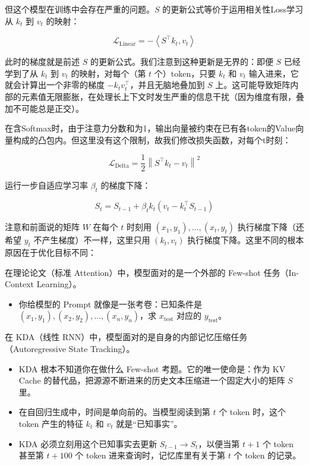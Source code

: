 但这个模型在训练中会存在严重的问题。\(S\) 的更新公式等价于运用相关性Loss学习从 \(k_t\) 到 \(v_t\) 的映射：

\[
\mathcal{L}_{\mathrm{Linear}}=-\left\langle S^\top k_t,v_t\right\rangle
\]

此时的梯度就是前述 \(S\) 的更新公式。我们注意到这种更新是无界的：即便 \(S\) 已经学到了从 \(k_t\) 到 \(v_t\) 的映射，对每个（第 \(t\) 个）token，只要 \(k_t\) 和 \(v_t\) 输入进来，它就会计算出一个非零的梯度 \(-k_tv_t^\top\)，并且无脑地叠加到 \(S\) 上。这可能导致矩阵内部的元素值无限膨胀，在处理长上下文时发生严重的信息干扰（因为维度有限，叠加不可能总是正交）。

在含Softmax时，由于注意力分数和为1，输出向量被约束在已有各token的Value向量构成的凸包内。但这里没有这个限制，故我们修改损失函数，对每个t时刻：

\[
\mathcal{L}_{\mathrm{Delta}}=\frac{1}{2}\left\lVert S^\top k_t-v_t\right\rVert^2
\]

运行一步自适应学习率 \(\beta_t\) 的梯度下降：

\[
S_t=S_{t-1}+\beta_tk_t\left(v_t-k_t^\top S_{t-1}\right)
\]

注意和前面说的矩阵 \(W\) 在每个 \(t\) 时刻用 \((x_1,y_1),\ldots,(x_t,y_t)\) 执行梯度下降（还希望 \(y_t\) 不产生梯度）不一样，这里只用 \((k_t,v_t)\) 执行梯度下降。这里不同的根本原因在于优化目标不同：

在理论论文（标准 Attention）中，模型面对的是一个外部的 Few-shot 任务（In-Context Learning）。

\begin{itemize}
\tightlist
\item
  你给模型的 Prompt 就像是一张考卷：已知条件是 \((x_1,y_1),(x_2,y_2),\ldots,(x_n,y_n)\)，求 \(x_{\mathrm{test}}\) 对应的 \(y_{\mathrm{test}}\)。
\end{itemize}

在 KDA（线性 RNN）中，模型面对的是自身的内部记忆压缩任务（Autoregressive State Tracking）。

\begin{itemize}
\tightlist
\item
  KDA 根本不知道你在做什么 Few-shot 考题。它的唯一使命是：作为 KV Cache 的替代品，把源源不断进来的历史文本压缩进一个固定大小的矩阵 \(S\) 里。
\item
  在自回归生成中，时间是单向前的。当模型阅读到第 \(t\) 个 token 时，这个 token 产生的特征 \(k_t\) 和 \(v_t\) 就是``已知事实''。
\item
  KDA 必须立刻用这个已知事实去更新 \(S_{t-1}\to S_t\)，以便当第 \(t+1\) 个 token 甚至第 \(t+100\) 个 token 进来查询时，记忆库里有关于第 \(t\) 个 token 的记录。
\end{itemize}

